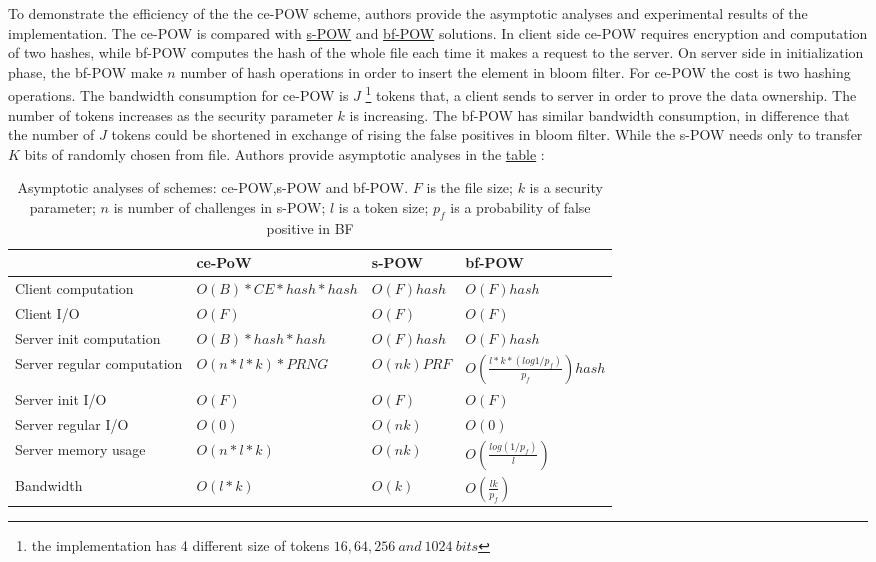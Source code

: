 \documentclass[12pt]{article}
\begin{document}
To demonstrate the efficiency of the the ce-POW scheme, authors provide the asymptotic  analyses and experimental results of the implementation. The ce-POW is compared with \hyperref[sub:Soltuion2]{s-POW} and \hyperref[sub:Soltuion6]{bf-POW} solutions. In client side ce-POW requires encryption and computation of two hashes, while bf-POW computes the hash of the whole file each time it makes a request to the server. On server side  in initialization phase, the bf-POW make $n$ number of hash operations in order to insert the element in bloom filter. For ce-POW the  cost is  two hashing operations. The bandwidth consumption for ce-POW is $J$ \footnote{ the implementation has 4 different size of tokens $16, 64, 256\ and\  1024\ bits$} tokens that, a client sends to server in order to prove the data ownership. The number of tokens increases as the security parameter $k$ is increasing. The bf-POW has  similar  bandwidth consumption, in difference that the number of $J$ tokens could be  shortened in exchange of rising the false positives in bloom filter. While the s-POW needs only to transfer $K$ bits of randomly chosen from file. Authors provide asymptotic analyses in the \hyperref[table:asymptoticAnalysisCE-POW]{table}  :


\begin{savenotes}
\begin{table}[!htpb]
\centering
\addtolength{\tabcolsep}{3pt}
\begin{tabular}{|L{4cm}|L{4cm}|L{2.5cm}|L{3.5cm}|}
\hline
&ce-PoW&s-POW&bf-POW\\
\hline
Client computation&$O(B)*CE*hash*hash$ & $O(F)hash$ & $O(F)hash$ \\
\hline
Client I/O&$O(F)$&$O(F)$&$O(F)$\\
\hline
Server init computation &$O(B)*hash*hash$&$O(F) hash$&$O(F)hash$\\
\hline
Server regular computation &$O(n * l *k)*PRNG$&$O(nk) PRF$& $O(\frac{l*k*(log1/p_f)}{p_f})hash$\\
\hline
Server init I/O &$O(F)$&$O(F)$&$O(F)$\\
\hline
Server regular I/O &$O(0)$&$O(nk)$&$O(0)$\\
\hline
Server memory usage&$O(n * l *k)$&$O(nk)$&$O(\frac{log(1/p_f)}{l})$\\
\hline
Bandwidth&$O(l *k)$&$O(k)$&$O(\frac{lk}{p_f})$\\
\hline
\end{tabular}
\caption{Asymptotic analyses of schemes: ce-POW,s-POW and bf-POW. $F$ is the file size; $k$ is a security parameter; $n$ is number of challenges in s-POW;  $l$ is a token size; $p_f$ is a probability of false positive in BF \cite{ce-POW}}
\label{table:asymptoticAnalysisCE-POW}
\end{table}
\end{savenotes}
\end{document}
